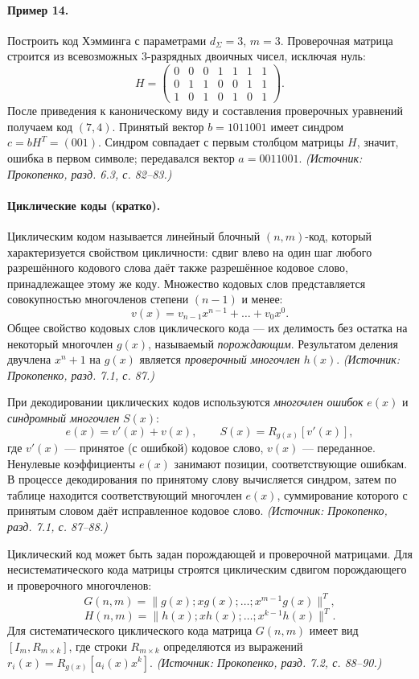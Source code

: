 \documentclass[a4paper,12pt]{article}
\begin{document}
\paragraph{Пример 14.}
Построить код Хэмминга с параметрами \(d_\Sigma=3\), \(m=3\). Проверочная матрица строится из всевозможных 3-разрядных двоичных чисел, исключая нуль:
\[
H=\begin{pmatrix}0&0&0&1&1&1&1\\0&1&1&0&0&1&1\\1&0&1&0&1&0&1\end{pmatrix}.
\]
После приведения к каноническому виду и составления проверочных уравнений получаем код \((7,4)\). Принятый вектор \(b=1011001\) имеет синдром \(c=bH^T=(001)\). Синдром совпадает с первым столбцом матрицы \(H\), значит, ошибка в первом символе; передавался вектор \(a=0011001\).
\textit{(Источник: Прокопенко, разд. 6.3, с. 82--83.)}

\paragraph{Циклические коды (кратко).}
Циклическим кодом называется линейный блочный \((n,m)\)-код, который характеризуется свойством цикличности: сдвиг влево на один шаг любого разрешённого кодового слова даёт также разрешённое кодовое слово, принадлежащее этому же коду. Множество кодовых слов представляется совокупностью многочленов степени \((n-1)\) и менее:
\[
v(x)=v_{n-1}x^{n-1}+\dots+v_0x^0.
\]
Общее свойство кодовых слов циклического кода — их делимость без остатка на некоторый многочлен \(g(x)\), называемый \emph{порождающим}. Результатом деления двучлена \(x^n+1\) на \(g(x)\) является \emph{проверочный многочлен} \(h(x)\).
\textit{(Источник: Прокопенко, разд. 7.1, с. 87.)}

При декодировании циклических кодов используются \emph{многочлен ошибок} \(e(x)\) и \emph{синдромный многочлен} \(S(x)\):
\[
e(x)=v'(x)+v(x),\qquad
S(x)=R_{g(x)}[v'(x)],
\]
где \(v'(x)\) — принятое (с ошибкой) кодовое слово, \(v(x)\) — переданное. Ненулевые коэффициенты \(e(x)\) занимают позиции, соответствующие ошибкам. В процессе декодирования по принятому слову вычисляется синдром, затем по таблице находится соответствующий многочлен \(e(x)\), суммирование которого с принятым словом даёт исправленное кодовое слово.
\textit{(Источник: Прокопенко, разд. 7.1, с. 87--88.)}

Циклический код может быть задан порождающей и проверочной матрицами. Для несистематического кода матрицы строятся циклическим сдвигом порождающего и проверочного многочленов:
\[
G(n,m)=\|g(x);xg(x);\dots;x^{m-1}g(x)\|^T,
\]
\[
H(n,m)=\|h(x);xh(x);\dots;x^{k-1}h(x)\|^T.
\]
Для систематического циклического кода матрица \(G(n,m)\) имеет вид \([I_m,R_{m\times k}]\), где строки \(R_{m\times k}\) определяются из выражений \(r_i(x)=R_{g(x)}[a_i(x)x^k]\).
\textit{(Источник: Прокопенко, разд. 7.2, с. 88--90.)}
\end{document}
